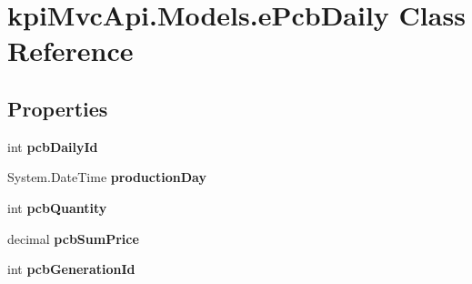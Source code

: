 \hypertarget{classkpi_mvc_api_1_1_models_1_1e_pcb_daily}{}\section{kpi\+Mvc\+Api.\+Models.\+e\+Pcb\+Daily Class Reference}
\label{classkpi_mvc_api_1_1_models_1_1e_pcb_daily}
\subsection*{Properties}
\begin{DoxyCompactItemize}
\item 
\mbox{\label{classkpi_mvc_api_1_1_models_1_1e_pcb_daily_aa9b34954b0fa52d4938016dfe8d27054}} 
int {\bfseries pcb\+Daily\+Id}
\item 
\mbox{\label{classkpi_mvc_api_1_1_models_1_1e_pcb_daily_ac84cb1606d1e005f5b48dd47c1476cb9}} 
System.\+Date\+Time {\bfseries production\+Day}
\item 
\mbox{\label{classkpi_mvc_api_1_1_models_1_1e_pcb_daily_ac76a6845dbd048b0e49e44fdfaa94c74}} 
int {\bfseries pcb\+Quantity}
\item 
\mbox{\label{classkpi_mvc_api_1_1_models_1_1e_pcb_daily_ac697443e6bf0ae00e550c06f8c630b5f}} 
decimal {\bfseries pcb\+Sum\+Price}
\item 
\mbox{\label{classkpi_mvc_api_1_1_models_1_1e_pcb_daily_a1509d6d664c84a8b84bd2360b77bdfdc}} 
int {\bfseries pcb\+Generation\+Id}
\item 
\mbox{\label{classkpi_mvc_api_1_1_models_1_1e_pcb_daily_a57c6baba39c6ed461a568b2c342f6bdd}} 

\end{DoxyCompactItemize}
